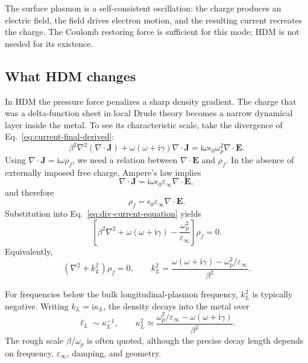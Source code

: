 \documentclass[11pt,a4paper]{article}
\newcommand{\E}{\mathbf E}
\newcommand{\J}{\mathbf J}
\newcommand{\ii}{\mathrm i}
\newcommand{\epsinf}{\varepsilon_\infty}
\newcommand{\omegap}{\omega_p}
\begin{document}
The surface plasmon is a self-consistent oscillation: the charge produces an
electric field, the field drives electron motion, and the resulting current
recreates the charge.  The Coulomb restoring force is sufficient for this
mode; HDM is not needed for its existence.

\subsection{What HDM changes}

In HDM the pressure force penalizes a sharp density gradient.  The charge that
was a delta-function sheet in local Drude theory becomes a narrow dynamical
layer inside the metal.  To see its characteristic scale, take the divergence
of Eq.~\eqref{eq:current-final-derived}:
\begin{equation}
    \beta^2\nabla^2(\nabla\!\cdot\!\J)
    +\omega(\omega+\ii\gamma)\nabla\!\cdot\!\J
    =\ii\omega\epsilon_0\omegap^2\nabla\!\cdot\!\E.
    \label{eq:div-current-equation}
\end{equation}
Using \(\nabla\!\cdot\!\J=\ii\omega\rho_f\), we need a relation between
\(\nabla\!\cdot\!\E\) and \(\rho_f\).  In the absence of externally imposed
free charge, Ampere's law implies
\begin{equation}
    \nabla\!\cdot\!\J
    =\ii\omega\epsilon_0\epsinf\nabla\!\cdot\!\E,
    \label{eq:divJ-divE}
\end{equation}
and therefore
\begin{equation}
    \rho_f=\epsilon_0\epsinf\nabla\!\cdot\!\E.
    \label{eq:rho-divE}
\end{equation}
Substitution into Eq.~\eqref{eq:div-current-equation} yields
\begin{equation}
    \boxed{
    \left[
      \beta^2\nabla^2
      +\omega(\omega+\ii\gamma)
      -\frac{\omegap^2}{\epsinf}
    \right]\rho_f=0.
    }
    \label{eq:rho-wave-equation}
\end{equation}
Equivalently,
\begin{equation}
    \left(\nabla^2+k_L^2\right)\rho_f=0,
    \qquad
    k_L^2=
    \frac{\omega(\omega+\ii\gamma)-\omegap^2/\epsinf}{\beta^2}.
    \label{eq:rho-kL}
\end{equation}

For frequencies below the bulk longitudinal-plasmon frequency, \(k_L^2\) is
typically negative.  Writing \(k_L=\ii\kappa_L\), the density decays into the
metal over
\begin{equation}
    \ell_L\sim\kappa_L^{-1},
    \qquad
    \kappa_L^2\simeq
    \frac{\omegap^2/\epsinf-\omega(\omega+\ii\gamma)}{\beta^2}.
    \label{eq:charge-layer-length}
\end{equation}
The rough scale \(\beta/\omegap\) is often quoted, although the precise decay
length depends on frequency, \(\epsinf\), damping, and geometry.
\end{document}
